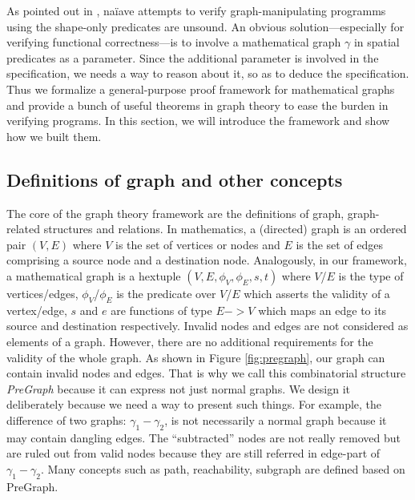 As pointed out in \cite{hobor:ramification}, na\"iave attempts to
verify graph-manipulating programms using the shape-only predicates
are unsound. An obvious solution---especially for verifying functional
correctness---is to involve a mathematical graph $\gamma$ in spatial
predicates as a parameter. Since the additional parameter is involved
in the specification, we needs a way to reason about it, so as to
deduce the specification. Thus we formalize a general-purpose proof
framework for mathematical graphs and provide a bunch of useful
theorems in graph theory to ease the burden in verifying programs. In
this section, we will introduce the framework and show how we built
them.

\subsection{Definitions of graph and other concepts}
The core of the graph theory framework are the definitions of graph,
graph-related structures and relations. In mathematics, a (directed)
graph is an ordered pair $(V, E)$ where $V$ is the set of vertices or
nodes and $E$ is the set of edges comprising a source node and a
destination node. Analogously, in our framework, a mathematical graph
is a hextuple $(V, E, \phi_V, \phi_E, s, t)$ where $V$/$E$ is the type
of vertices/edges, $\phi_V$/$\phi_E$ is the predicate over $V$/$E$
which asserts the validity of a vertex/edge, $s$ and $e$ are functions
of type $E -> V$ which maps an edge to its source and destination
respectively. Invalid nodes and edges are not considered as elements
of a graph. However, there are no additional requirements for the
validity of the whole graph. As shown in Figure \ref{fig:pregraph},
our graph can contain invalid nodes and edges. That is why we call
this combinatorial structure \emph{PreGraph} because it can express
not just normal graphs. We design it deliberately because we need a
way to present such things. For example, the difference of two graphs:
$\gamma_1-\gamma_2$, is not necessarily a normal graph because it may
contain dangling edges. The ``subtracted'' nodes are not really
removed but are ruled out from valid nodes because they are still
referred in edge-part of $\gamma_1-\gamma_2$. Many concepts such as
path, reachability, subgraph are defined based on PreGraph.


